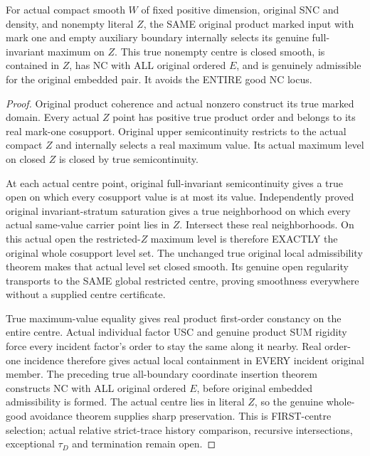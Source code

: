 \begin{theorem}
\label{hir:sharp-original-first-distinct-defect-restricted-maximum-centre}
\leanok
For actual compact smooth $W$ of fixed positive dimension, original SNC and
density, and nonempty literal $Z$, the SAME original product marked input
with mark one and empty auxiliary boundary internally selects its genuine
full-invariant maximum on $Z$. This true nonempty centre is closed smooth,
is contained in $Z$, has NC with ALL original ordered $E$, and is genuinely
admissible for the original embedded pair. It avoids the ENTIRE good NC locus.
\end{theorem}
\begin{proof}
Original product coherence and actual nonzero construct its true marked domain.
Every actual $Z$ point has positive true product order and belongs to its real
mark-one cosupport. Original upper semicontinuity restricts to the actual
compact $Z$ and internally selects a real maximum value. Its actual maximum
level on closed $Z$ is closed by true semicontinuity.

At each actual centre point, original full-invariant semicontinuity gives a
true open on which every cosupport value is at most its value. Independently
proved original invariant-stratum saturation gives a true neighborhood on
which every actual same-value carrier point lies in $Z$. Intersect these real
neighborhoods. On this actual open the restricted-$Z$ maximum level is
therefore EXACTLY the original whole cosupport level set. The unchanged true
original local admissibility theorem makes that actual level set closed smooth.
Its genuine open regularity transports to the SAME global restricted centre,
proving smoothness everywhere without a supplied centre certificate.

True maximum-value equality gives real product first-order constancy on the
entire centre. Actual individual factor USC and genuine product SUM rigidity
force every incident factor's order to stay the same along it nearby. Real
order-one incidence therefore gives actual local containment in EVERY incident
original member. The preceding true all-boundary coordinate insertion theorem
constructs NC with ALL original ordered $E$, before original embedded
admissibility is formed. The actual centre lies in literal $Z$, so the genuine
whole-good avoidance theorem supplies sharp preservation. This is FIRST-centre
selection; actual relative strict-trace history comparison, recursive
intersections, exceptional $\tau_D$ and termination remain open.
\end{proof}

